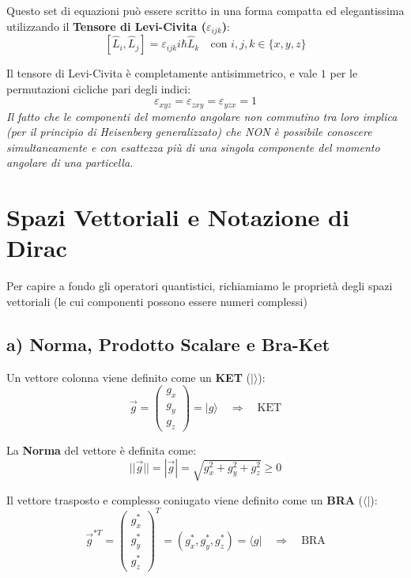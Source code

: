 \documentclass[11pt, a4paper]{article}
\begin{document}
\noindent
Questo set di equazioni può essere scritto in una forma compatta ed elegantissima utilizzando il \textbf{Tensore di Levi-Civita ($\varepsilon_{ijk}$)}: %
\begin{equation}
    \boxed{ [\hat{L}_i, \hat{L}_j] = \varepsilon_{ijk} i\hbar \hat{L}_k } \quad \text{con } i,j,k \in \{x,y,z\} %
\end{equation}

\noindent
Il tensore di Levi-Civita è completamente antisimmetrico, e vale $1$ per le permutazioni cicliche pari degli indici: %
\begin{equation*}
    \varepsilon_{xyz} = \varepsilon_{zxy} = \varepsilon_{yzx} = 1 %
\end{equation*}
\textit{Il fatto che le componenti del momento angolare non commutino tra loro implica (per il principio di Heisenberg generalizzato) che NON è possibile conoscere simultaneamente e con esattezza più di una singola componente del momento angolare di una particella.}

\section{Spazi Vettoriali e Notazione di Dirac} %

Per capire a fondo gli operatori quantistici, richiamiamo le proprietà degli spazi vettoriali (le cui componenti possono essere numeri complessi) %

\subsection{a) Norma, Prodotto Scalare e Bra-Ket} %

Un vettore colonna viene definito come un \textbf{KET} ($| \rangle$): %
\begin{equation*}
    \vec{g} = \begin{pmatrix} g_x \\ g_y \\ g_z \end{pmatrix} = |g\rangle \quad \Rightarrow \quad \text{KET} %
\end{equation*}

La \textbf{Norma} del vettore è definita come: %
\begin{equation*}
    ||\vec{g}|| = |\vec{g}| = \sqrt{g_x^2 + g_y^2 + g_z^2} \ge 0 %
\end{equation*}

Il vettore trasposto e complesso coniugato viene definito come un \textbf{BRA} ($\langle |$): %
\begin{equation*}
    \vec{g}^{*T} = \begin{pmatrix} g_x^* \\ g_y^* \\ g_z^* \end{pmatrix}^T = (g_x^*, g_y^*, g_z^*) = \langle g| \quad \Rightarrow \quad \text{BRA} %
\end{equation*}
\end{document}
